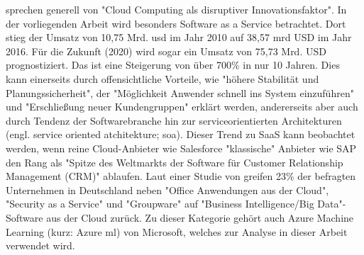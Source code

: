 \citep[S.~23]{appelrath_future_2014-1} sprechen generell von "Cloud Computing als disruptiver Innovationsfaktor". In der vorliegenden Arbeit wird besonders Software as a Service betrachtet. Dort stieg der Umsatz von 10,75 Mrd. \gls{usd} im Jahr 2010 auf 38,57 \gls{mrd} USD im Jahr 2016. Für die Zukunft (2020) wird sogar ein Umsatz von 75,73 Mrd. USD prognostiziert.\citep{gartner_umsatz_2017} Das ist eine Steigerung von über 700\% in nur 10 Jahren. Dies kann einerseits durch offensichtliche Vorteile, wie "höhere Stabilität und Planungssicherheit", der "Möglichkeit Anwender schnell ins System einzuführen" und "Erschließung neuer Kundengruppen"\citep{fraunhofer_vorteile_2010} erklärt werden, andererseits aber auch durch Tendenz der Softwarebranche hin zur serviceorientierten Architekturen (engl. service oriented atchitekture; \gls{soa}).\citep[S.~22]{appelrath_future_2014-1} Dieser Trend zu SaaS kann beobachtet werden, wenn reine Cloud-Anbieter wie Salesforce "klassische" Anbieter wie SAP den Rang als "Spitze des Weltmarkts der Software für Customer Relationship Management (CRM)"\citep{fritsch_salesforce.com_2013} ablaufen.\newline
Laut einer Studie von \citep{bitkom_welche_2017} greifen 23\% der befragten Unternehmen in Deutschland neben "Office Anwendungen aus der Cloud", "Security as a Service" und "Groupware" auf "Business Intelligence/Big Data"-Software aus der Cloud zurück. Zu dieser Kategorie gehört auch Azure Machine Learning (kurz: Azure \gls{ml}) von Microsoft, welches zur Analyse in dieser Arbeit verwendet wird.